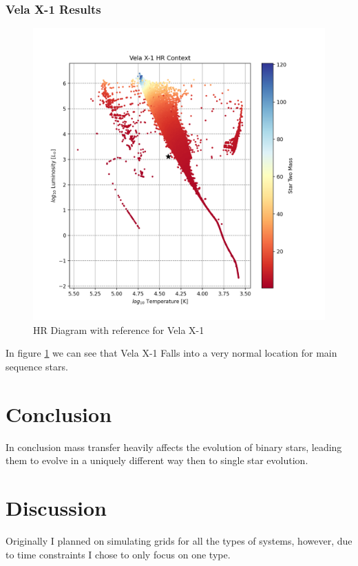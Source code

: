 \documentclass[12pt, letterpaper]{article}
\begin{document}
            \subsubsection{Vela X-1 Results}
            \begin{figure}[H] 
                \centering
                \includegraphics[scale = .6]{figs/Generated Figs/ Vela X-1 HR Context Star Two Mass log10 F star radius 5.png}
                \caption{HR Diagram with reference for Vela X-1}
                \label{VelaX1Results}
            \end{figure}
            In figure \ref{VelaX1Results} we can see that Vela X-1 Falls into a very normal location for main sequence stars.

\section{\centering Conclusion}
    In conclusion mass transfer heavily affects the evolution of binary stars, leading them to evolve in a uniquely different way then to single star evolution. 

\section{\centering Discussion}   
    Originally I planned on simulating grids for all the types of systems, however, due to time constraints I chose to only focus on one type. 
\end{document}
